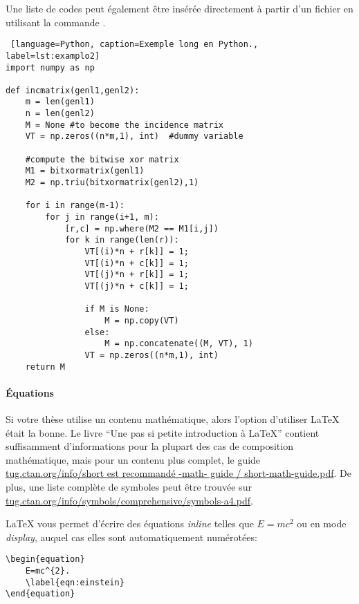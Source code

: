 Une liste de codes peut également être insérée directement à partir d'un fichier en utilisant la commande \verb||.

\begin{minipage}{0.9 \linewidth}
    \begin{lstlisting} [language=Python, caption=Exemple long en Python., label=lst:examplo2]
import numpy as np
    
def incmatrix(genl1,genl2):
    m = len(genl1)
    n = len(genl2)
    M = None #to become the incidence matrix
    VT = np.zeros((n*m,1), int)  #dummy variable
    
    #compute the bitwise xor matrix
    M1 = bitxormatrix(genl1)
    M2 = np.triu(bitxormatrix(genl2),1) 

    for i in range(m-1):
        for j in range(i+1, m):
            [r,c] = np.where(M2 == M1[i,j])
            for k in range(len(r)):
                VT[(i)*n + r[k]] = 1;
                VT[(i)*n + c[k]] = 1;
                VT[(j)*n + r[k]] = 1;
                VT[(j)*n + c[k]] = 1;
                
                if M is None:
                    M = np.copy(VT)
                else:
                    M = np.concatenate((M, VT), 1)               
                VT = np.zeros((n*m,1), int)  
    return M
    \end{lstlisting}
\end{minipage}


\paragraph{Équations}

Si votre thèse utilise un contenu mathématique, alors l'option d'utiliser \LaTeX{} était la bonne. Le livre ``Une pas si petite introduction à \LaTeX{}'' contient suffisamment d'informations pour la plupart des cas de composition mathématique, mais pour un contenu plus complet, le guide \url{tug.ctan.org/info/short est recommandé -math- guide / short-math-guide.pdf}. De plus, une liste complète de symboles peut être trouvée sur \url{tug.ctan.org/info/symbols/comprehensive/symbols-a4.pdf}.

\LaTeX{} vous permet d'écrire des équations \textit{inline} telles que $E = mc^{2}$ ou en mode \textit{display}, auquel cas elles sont automatiquement numérotées:
\begin{verbatim}
\begin{equation}
    E=mc^{2}.
    \label{eqn:einstein}
\end{equation}
\end{verbatim}

